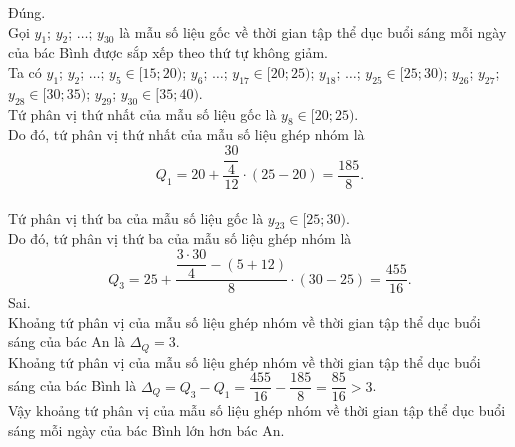 \begin{ex}
{\begin{itemchoice}
			\itemch Đúng. \\
			Gọi $y_1$; $y_2$; $\ldots$; $y_{30}$ là mẫu số liệu gốc về thời gian tập thể dục buổi sáng mỗi ngày của bác Bình được sắp xếp theo thứ tự không giảm. \\
			Ta có $y_1$; $y_2$; $\ldots$; $y_5 \in [15; 20)$; $y_6$; $\ldots$; $y_{17} \in [20; 25)$; $y_{18}$; $\ldots$; $y_{25} \in [25; 30)$; $y_{26}$; $y_{27}$; $y_{28} \in [30; 35)$; $y_{29}$; $y_{30} \in [35; 40)$.\\
			Tứ phân vị thứ nhất của mẫu số liệu gốc là $y_8 \in [20; 25)$. \\
			Do đó, tứ phân vị thứ nhất của mẫu số liệu ghép nhóm là 
			\[Q_1 = 20 + \dfrac{\dfrac{30}{4}}{12} \cdot (25 - 20) = \dfrac{185}{8}.\] \\
			Tứ phân vị thứ ba của mẫu số liệu gốc là $y_{23} \in [25; 30)$. \\
			Do đó, tứ phân vị thứ ba của mẫu số liệu ghép nhóm là 
			\[Q_3 = 25 + \dfrac{\dfrac{3 \cdot 30}{4} - (5 + 12) }{8} \cdot (30 - 25) = \dfrac{455}{16}.\] 
			\itemch Sai.\\
			 Khoảng tứ phân vị của mẫu số liệu ghép nhóm về thời gian tập thể dục buổi sáng của bác An là $\Delta_Q = 3$. \\
			 Khoảng tứ phân vị của mẫu số liệu ghép nhóm về thời gian tập thể dục buổi sáng của bác Bình là $\Delta_Q = Q_3 - Q_1 = \dfrac{455}{16} - \dfrac{185}{8} = \dfrac{85}{16} > 3$. \\
			 Vậy khoảng tứ phân vị của mẫu số liệu ghép nhóm về thời gian tập thể dục buổi sáng mỗi ngày của bác Bình lớn hơn bác An.
		\end{itemchoice}
	}
\end{ex}

